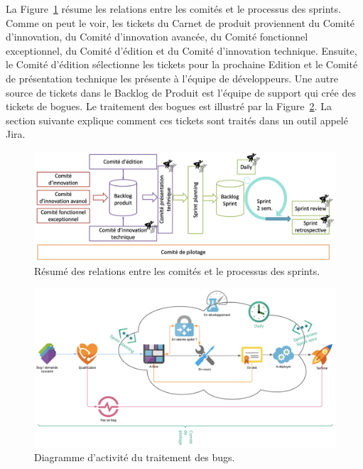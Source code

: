 La Figure~\ref{fig:committees-and-scrum} résume les relations entre les comités et le processus des sprints. Comme on peut le voir, les tickets du Carnet de produit proviennent du Comité d'innovation, du Comité d'innovation avancée, du Comité fonctionnel exceptionnel, du Comité d'édition et du Comité d'innovation technique. Ensuite, le Comité d'édition sélectionne les tickets pour la prochaine Edition et le Comité de présentation technique les présente à l'équipe de développeurs. Une autre source de tickets dans le Backlog de Produit est l'équipe de support qui crée des tickets de bogues. Le traitement des bogues est illustré par la Figure~\ref{fig:treatment-of-bugs}. La section suivante explique comment ces tickets sont traités dans un outil appelé Jira.

\begin{figure}[h]
    \centering
    \includegraphics[width=\textwidth]{img/committees-and-scrum}
    \caption{Résumé des relations entre les comités et le processus des sprints.}
    \label{fig:committees-and-scrum}
\end{figure}

\begin{figure}[h]
    \centering
    \includegraphics[width=\textwidth]{img/treatment-of-bugs}
    \caption{Diagramme d'activité du traitement des bugs.}
    \label{fig:treatment-of-bugs}
\end{figure}